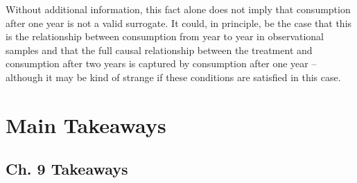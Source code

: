 \documentclass[10pt]{article}
\begin{document}
Without additional information, this fact alone 
does not imply that consumption after one year is not a valid surrogate.
It could, in principle, be the case that 
this is the relationship between consumption from year to year 
in observational samples and that the full causal relationship between
the treatment and consumption after two years is captured 
by consumption after one year -- although it may be 
kind of strange if these conditions are satisfied in this case.


\section{Main Takeaways}

\subsection{Ch. 9 Takeaways}
\end{document}

